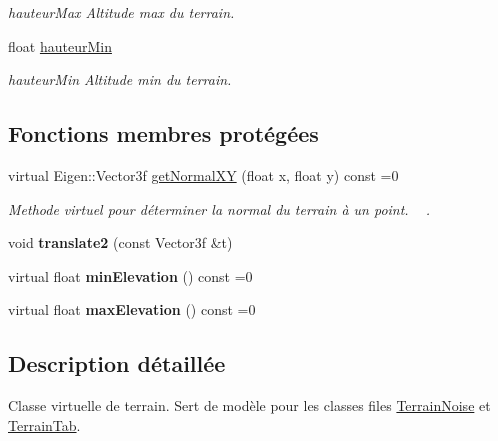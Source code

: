 \begin{DoxyCompactItemize}
\begin{DoxyCompactList}\small\item\em hauteur\+Max Altitude max du terrain. \end{DoxyCompactList}\item 
\hypertarget{class_terrain_ac89016fab6410586b08877b5c9790f27}{}float \hyperlink{class_terrain_ac89016fab6410586b08877b5c9790f27}{hauteur\+Min}\label{class_terrain_ac89016fab6410586b08877b5c9790f27}

\begin{DoxyCompactList}\small\item\em hauteur\+Min Altitude min du terrain. \end{DoxyCompactList}\end{DoxyCompactItemize}
\subsection*{Fonctions membres protégées}
\begin{DoxyCompactItemize}
\item 
virtual Eigen\+::\+Vector3f \hyperlink{class_terrain_a8b666ed9d5f948734b0d1c49adb6b535}{get\+Normal\+X\+Y} (float x, float y) const  =0
\begin{DoxyCompactList}\small\item\em Methode virtuel pour déterminer la normal du terrain à un point. ~\newline
. \end{DoxyCompactList}\item 
\hypertarget{class_terrain_a43f84c68d70b49af90637150c30e6f8b}{}void {\bfseries translate2} (const Vector3f \&t)\label{class_terrain_a43f84c68d70b49af90637150c30e6f8b}

\item 
\hypertarget{class_terrain_a9d8a4b5fabf8b8840a623ddf070cd866}{}virtual float {\bfseries min\+Elevation} () const  =0\label{class_terrain_a9d8a4b5fabf8b8840a623ddf070cd866}

\item 
\hypertarget{class_terrain_abd5ed37d041486bb06e7fedd5fa964a4}{}virtual float {\bfseries max\+Elevation} () const  =0\label{class_terrain_abd5ed37d041486bb06e7fedd5fa964a4}

\end{DoxyCompactItemize}


\subsection{Description détaillée}
Classe virtuelle de terrain. Sert de modèle pour les classes files \hyperlink{class_terrain_noise}{Terrain\+Noise} et \hyperlink{class_terrain_tab}{Terrain\+Tab}. 

